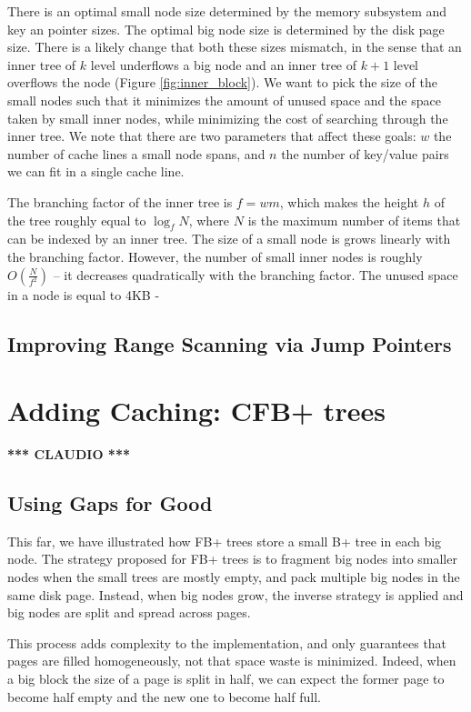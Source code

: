 \documentclass{article}
\newcommand{\claudio}{\textcolor{Cerulean}{\textbf{*** CLAUDIO ***} }}
\begin{document}
There is an optimal small node size determined by the memory subsystem and key an pointer sizes. The optimal big node size is determined by the disk page size. There is a likely change that both these sizes  mismatch, in the sense that an inner tree of $k$ level underflows a big node and an inner tree of $k+1$ level overflows the node (Figure \ref{fig:inner_block}). We want to pick the size of the small nodes such that it minimizes the amount of unused space and the space taken by small inner nodes, while minimizing the cost of searching through the inner tree. We note that there are two parameters that affect these goals: $w$ the number of cache lines a small node spans, and $n$ the number of key/value pairs we can fit in a single cache line. 

The branching factor of the inner tree is $f=wm$, which makes the height $h$ of the tree roughly equal to $\log_f N$, where $N$ is the maximum number of items that can be indexed by an inner tree. The size of a small node is grows linearly with the branching factor. However, the number of small inner nodes is roughly $O(\frac{N}{f^2})$ -- it decreases quadratically with the branching factor. The unused space in a node is equal to 4KB - 

\subsection{Improving Range Scanning via Jump Pointers}

\section{Adding Caching: CFB+ trees}
\claudio
\subsection{Using Gaps for Good}
This far, we have illustrated how FB+ trees store a small B+ tree in each big node.
The strategy proposed for FB+ trees is to fragment big nodes into smaller nodes when the small trees
are mostly empty, and pack multiple big nodes in the same disk page.
Instead, when big nodes grow, the inverse strategy is applied and big nodes are split and spread
across pages.

This process adds complexity to the implementation, and only guarantees that pages are filled
homogeneously, not that space waste is minimized.
Indeed, when a big block the size of a page is split in half,
we can expect the former page to become half empty and the new one to become half full.
\end{document}
